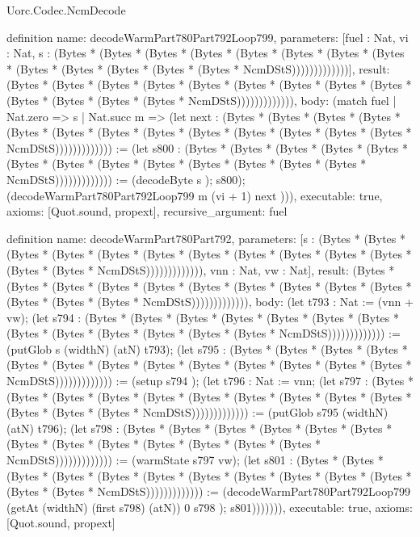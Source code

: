 \begin{lexlean}{Uorc.Codec.NcmDecode}
\begin{semanticmodule}
definition{
  name: decodeWarmPart780Part792Loop799,
  parameters: [fuel : Nat, vi : Nat, s : (Bytes * (Bytes * (Bytes * (Bytes * (Bytes * (Bytes * (Bytes * (Bytes * (Bytes * (Bytes * (Bytes * (Bytes * (Bytes * NcmDStS)))))))))))))],
  result: (Bytes * (Bytes * (Bytes * (Bytes * (Bytes * (Bytes * (Bytes * (Bytes * (Bytes * (Bytes * (Bytes * (Bytes * (Bytes * NcmDStS))))))))))))),
  body: (match fuel
    | Nat.zero => s
    | Nat.succ m => (let next : (Bytes * (Bytes * (Bytes * (Bytes * (Bytes * (Bytes * (Bytes * (Bytes * (Bytes * (Bytes * (Bytes * (Bytes * (Bytes * NcmDStS))))))))))))) := (let s800 : (Bytes * (Bytes * (Bytes * (Bytes * (Bytes * (Bytes * (Bytes * (Bytes * (Bytes * (Bytes * (Bytes * (Bytes * (Bytes * NcmDStS))))))))))))) := (decodeByte s ); s800); (decodeWarmPart780Part792Loop799 m (vi + 1) next ))),
  executable: true,
  axioms: [Quot.sound, propext],
  recursive_argument: fuel
}

definition{
  name: decodeWarmPart780Part792,
  parameters: [s : (Bytes * (Bytes * (Bytes * (Bytes * (Bytes * (Bytes * (Bytes * (Bytes * (Bytes * (Bytes * (Bytes * (Bytes * (Bytes * NcmDStS))))))))))))), vnn : Nat, vw : Nat],
  result: (Bytes * (Bytes * (Bytes * (Bytes * (Bytes * (Bytes * (Bytes * (Bytes * (Bytes * (Bytes * (Bytes * (Bytes * (Bytes * NcmDStS))))))))))))),
  body: (let t793 : Nat := (vnn + vw); (let s794 : (Bytes * (Bytes * (Bytes * (Bytes * (Bytes * (Bytes * (Bytes * (Bytes * (Bytes * (Bytes * (Bytes * (Bytes * (Bytes * NcmDStS))))))))))))) := (putGlob s (widthN) (atN) t793); (let s795 : (Bytes * (Bytes * (Bytes * (Bytes * (Bytes * (Bytes * (Bytes * (Bytes * (Bytes * (Bytes * (Bytes * (Bytes * (Bytes * NcmDStS))))))))))))) := (setup s794 ); (let t796 : Nat := vnn; (let s797 : (Bytes * (Bytes * (Bytes * (Bytes * (Bytes * (Bytes * (Bytes * (Bytes * (Bytes * (Bytes * (Bytes * (Bytes * (Bytes * NcmDStS))))))))))))) := (putGlob s795 (widthN) (atN) t796); (let s798 : (Bytes * (Bytes * (Bytes * (Bytes * (Bytes * (Bytes * (Bytes * (Bytes * (Bytes * (Bytes * (Bytes * (Bytes * (Bytes * NcmDStS))))))))))))) := (warmState s797 vw); (let s801 : (Bytes * (Bytes * (Bytes * (Bytes * (Bytes * (Bytes * (Bytes * (Bytes * (Bytes * (Bytes * (Bytes * (Bytes * (Bytes * NcmDStS))))))))))))) := (decodeWarmPart780Part792Loop799 (getAt (widthN) (first s798) (atN)) 0 s798 ); s801))))))),
  executable: true,
  axioms: [Quot.sound, propext]
}


\end{semanticmodule}
\end{lexlean}
